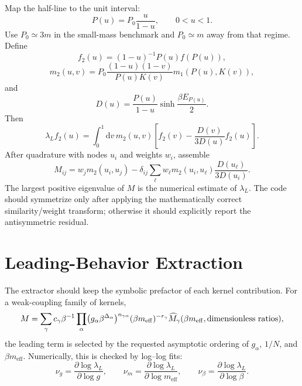 \documentclass[11pt]{article}
\newcommand{\dd}{\mathrm{d}}
\newcommand{\eff}{\mathrm{eff}}
\begin{document}
Map the half-line to the unit interval:
\begin{equation}
  P(u)=P_0\frac{u}{1-u},
  \qquad 0<u<1.
  \label{eq:half-line-map}
\end{equation}
Use \(P_0\simeq 3m\) in the small-mass benchmark and \(P_0\simeq m\) away from
that regime. Define
\begin{equation}
  f_2(u)=(1-u)^{-1}P(u)f(P(u)),
  \label{eq:f2}
\end{equation}
\begin{equation}
  m_2(u,v)
  =
  P_0
  \frac{(1-u)(1-v)}{P(u)K(v)}
  m_1(P(u),K(v)),
  \label{eq:m2}
\end{equation}
and
\begin{equation}
  D(u)
  =
  \frac{P(u)}{1-u}
  \sinh\frac{\beta E_{P(u)}}{2}.
  \label{eq:D}
\end{equation}
Then
\begin{equation}
  \lambda_L f_2(u)
  =
  \int_0^1\dd v\,m_2(u,v)
  \left[
    f_2(v)-\frac{D(v)}{3D(u)}f_2(u)
  \right].
  \label{eq:symmetric-equation}
\end{equation}
After quadrature with nodes \(u_i\) and weights \(w_i\), assemble
\begin{equation}
  M_{ij}
  =
  w_j m_2(u_i,u_j)
  -
  \delta_{ij}
  \sum_{\ell}
  w_\ell m_2(u_i,u_\ell)
  \frac{D(u_\ell)}{3D(u_i)}.
  \label{eq:discrete-matrix}
\end{equation}
The largest positive eigenvalue of \(M\) is the numerical estimate of
\(\lambda_L\). The code should symmetrize only after applying the mathematically
correct similarity/weight transform; otherwise it should explicitly report the
antisymmetric residual.

\section{Leading-Behavior Extraction}

The extractor should keep the symbolic prefactor of each kernel contribution.
For a weak-coupling family of kernels,
\begin{equation}
  M
  =
  \sum_\gamma
  c_\gamma
  \beta^{-1}
  \prod_\alpha
  \bigl(g_\alpha\beta^{\Delta_\alpha}\bigr)^{n_{\gamma\alpha}}
  (\beta m_{\eff})^{-r_\gamma}
  \widehat M_\gamma(\beta m_{\eff},\hbox{dimensionless ratios}),
  \label{eq:scaling-kernel}
\end{equation}
the leading term is selected by the requested asymptotic ordering of
\(g_\alpha\), \(1/N\), and \(\beta m_{\eff}\). Numerically, this is checked by
log--log fits:
\begin{equation}
  \nu_g =
  \frac{\partial\log\lambda_L}{\partial\log g},
  \qquad
  \nu_m =
  \frac{\partial\log\lambda_L}{\partial\log m_{\eff}},
  \qquad
  \nu_\beta =
  \frac{\partial\log\lambda_L}{\partial\log \beta}.
  \label{eq:exponent-fits}
\end{equation}
\end{document}
